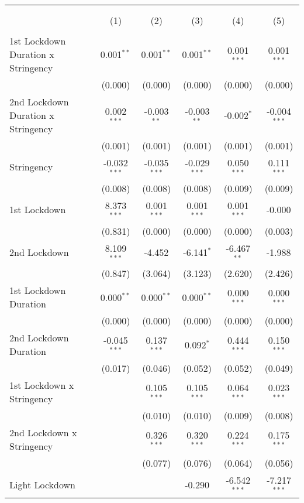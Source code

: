 \begin{tabular}{@{\extracolsep{5pt}}lccccc}
\\[-1.8ex]\hline
\hline \\[-1.8ex]
& \multicolumn{5}{c}{\textit{}} \
\cr \cline{5-6}
\\[-1.8ex] & (1) & (2) & (3) & (4) & (5) \\
\hline \\[-1.8ex]
 1st Lockdown Duration x Stringency & 0.001$^{**}$ & 0.001$^{**}$ & 0.001$^{**}$ & 0.001$^{***}$ & 0.001$^{***}$ \\
  & (0.000) & (0.000) & (0.000) & (0.000) & (0.000) \\
 2nd Lockdown Duration x Stringency & 0.002$^{***}$ & -0.003$^{**}$ & -0.003$^{**}$ & -0.002$^{*}$ & -0.004$^{***}$ \\
  & (0.001) & (0.001) & (0.001) & (0.001) & (0.001) \\
 Stringency & -0.032$^{***}$ & -0.035$^{***}$ & -0.029$^{***}$ & 0.050$^{***}$ & 0.111$^{***}$ \\
  & (0.008) & (0.008) & (0.008) & (0.009) & (0.009) \\
 1st Lockdown & 8.373$^{***}$ & 0.001$^{***}$ & 0.001$^{***}$ & 0.001$^{***}$ & -0.000$^{}$ \\
  & (0.831) & (0.000) & (0.000) & (0.000) & (0.003) \\
 2nd Lockdown & 8.109$^{***}$ & -4.452$^{}$ & -6.141$^{*}$ & -6.467$^{**}$ & -1.988$^{}$ \\
  & (0.847) & (3.064) & (3.123) & (2.620) & (2.426) \\
 1st Lockdown Duration & 0.000$^{**}$ & 0.000$^{**}$ & 0.000$^{**}$ & 0.000$^{***}$ & 0.000$^{***}$ \\
  & (0.000) & (0.000) & (0.000) & (0.000) & (0.000) \\
 2nd Lockdown Duration & -0.045$^{***}$ & 0.137$^{***}$ & 0.092$^{*}$ & 0.444$^{***}$ & 0.150$^{***}$ \\
  & (0.017) & (0.046) & (0.052) & (0.052) & (0.049) \\
 1st Lockdown x Stringency & & 0.105$^{***}$ & 0.105$^{***}$ & 0.064$^{***}$ & 0.023$^{***}$ \\
  & & (0.010) & (0.010) & (0.009) & (0.008) \\
 2nd Lockdown x Stringency & & 0.326$^{***}$ & 0.320$^{***}$ & 0.224$^{***}$ & 0.175$^{***}$ \\
  & & (0.077) & (0.076) & (0.064) & (0.056) \\
 Light Lockdown & & & -0.290$^{}$ & -6.542$^{***}$ & -7.217$^{***}$ \\

\end{tabular}
